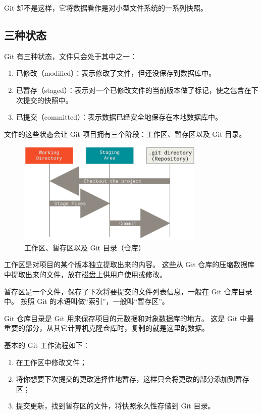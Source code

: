 \documentclass{ctexart}
\begin{document}
    Git 却不是这样，它将数据看作是对小型文件系统的一系列快照。

\subsection{三种状态}
    Git 有三种状态，文件只会处于其中之一：

    \begin{enumerate}[labelindent=\parindent, leftmargin=*, align=left]
        \item 已修改（modified）：表示修改了文件，但还没保存到数据库中。
        \item 已暂存（staged）：表示对一个已修改文件的当前版本做了标记，使之包含在下次提交的快照中。
        \item 已提交（committed）：表示数据已经安全地保存在本地数据库中。
    \end{enumerate}

    文件的这些状态会让 Git 项目拥有三个阶段：工作区、暂存区以及 Git 目录。

\begin{figure}[htbp]
    \centering
    \includegraphics[width=0.80\textwidth]{pictures/01.png}
    \caption{工作区、暂存区以及 Git 目录（仓库）}
\end{figure}

    工作区是对项目的某个版本独立提取出来的内容。
    这些从 Git 仓库的压缩数据库中提取出来的文件，放在磁盘上供用户使用或修改。

    暂存区是一个文件，保存了下次将要提交的文件列表信息，一般在 Git 仓库目录中。
    按照 Git 的术语叫做“索引”，一般叫“暂存区”。

    Git 仓库目录是 Git 用来保存项目的元数据和对象数据库的地方。
    这是 Git 中最重要的部分，从其它计算机克隆仓库时，复制的就是这里的数据。

    基本的 Git 工作流程如下：

\begin{enumerate}[labelindent=\parindent, leftmargin=*, align=left]
    \item 在工作区中修改文件；
    \item 将你想要下次提交的更改选择性地暂存，这样只会将更改的部分添加到暂存区；
    \item 提交更新，找到暂存区的文件，将快照永久性存储到 Git 目录。
\end{enumerate}
\end{document}

